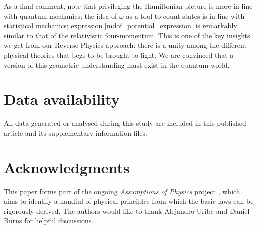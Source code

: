 \documentclass[fleqn,10pt]{wlscirep}
\begin{document}
As a final comment, note that privileging the Hamiltonian picture is more in line with quantum mechanics; the idea of $\omega$ as a tool to count states is in line with statistical mechanics; expression \ref{mdof_potential_expression} is remarkably similar to that of the relativistic four-momentum. This is one of the key insights we get from our Reverse Physics approach: there is a unity among the different physical theories that begs to be brought to light. We are convinced that a version of this geometric understanding must exist in the quantum world.

\vspace{-1mm}
\section*{Data availability}
All data generated or analysed during this study are included in this published article and its supplementary information files.

\vspace{-1mm}
\section*{Acknowledgments}
This paper forms part of the ongoing \textit{Assumptions of Physics} project \cite{aop-book}, which aims to identify a handful of physical principles from which the basic laws can be rigorously derived. The authors would like to thank Alejandro Uribe and Daniel Burns for helpful discussions. 


\end{document}
